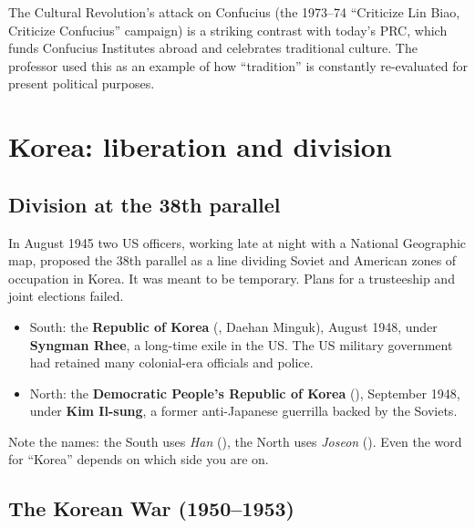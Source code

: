 \begin{aside}
The Cultural Revolution's attack on Confucius (the 1973--74 ``Criticize Lin Biao,
Criticize Confucius'' campaign) is a striking contrast with today's PRC, which funds
Confucius Institutes abroad and celebrates traditional culture. The professor used this as
an example of how ``tradition'' is constantly re-evaluated for present political purposes.
\end{aside}

\section{Korea: liberation and division}

\subsection{Division at the 38th parallel}

In August 1945 two US officers, working late at night with a National Geographic map,
proposed the 38th parallel as a line dividing Soviet and American zones of occupation in
Korea. It was meant to be temporary. Plans for a trusteeship and joint elections failed.

\begin{itemize}
  \item South: the \textbf{Republic of Korea} (, Daehan Minguk), August 1948,
        under \textbf{Syngman Rhee}, a long-time exile in the US. The US military government
        had retained many colonial-era officials and police.
  \item North: the \textbf{Democratic People's Republic of Korea} (),
        September 1948, under \textbf{Kim Il-sung}, a former anti-Japanese guerrilla
        backed by the Soviets.
\end{itemize}

\begin{remark}
Note the names: the South uses \emph{Han} (), the North uses \emph{Joseon}
(). Even the word for ``Korea'' depends on which side you are on.
\end{remark}

\subsection{The Korean War (1950--1953)}

